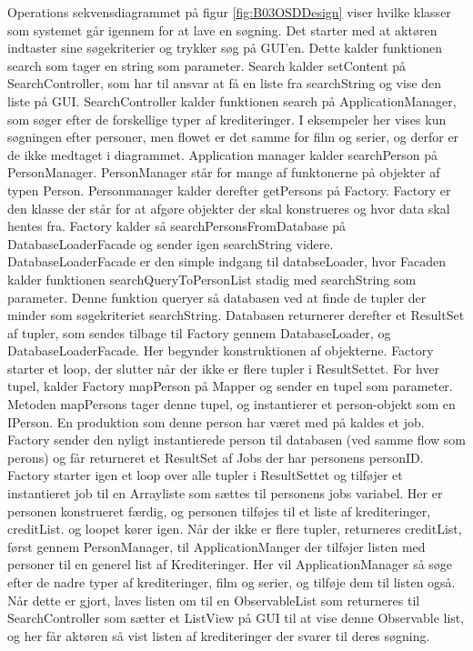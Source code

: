 Operations sekvensdiagrammet på figur \ref{fig:B03OSDDesign} viser hvilke klasser som systemet går igennem for at lave en søgning. Det starter med at aktøren indtaster sine søgekriterier og trykker søg på GUI'en. Dette kalder funktionen search som tager en string som parameter. Search kalder setContent på SearchController, som har til ansvar at få en liste fra searchString og vise den liste på GUI. SearchController kalder funktionen search på ApplicationManager, som søger efter de forskellige typer af krediteringer. I eksempeler her vises kun søgningen efter personer, men flowet er det samme for film og serier, og derfor er de ikke medtaget i diagrammet. Application manager kalder searchPerson på PersonManager. PersonManager står for mange af funktonerne på objekter af typen Person. Personmanager kalder derefter getPersons på Factory. Factory er den klasse der står for at afgøre objekter der skal konstrueres og hvor data skal hentes fra. Factory kalder så searchPersonsFromDatabase på DatabaseLoaderFacade og sender igen searchString videre. DatabaseLoaderFacade er den simple indgang til databseLoader, hvor Facaden kalder funktionen searchQueryToPersonList stadig med searchString som parameter. Denne funktion queryer så databasen ved at finde de tupler der minder som søgekriteriet searchString. Databasen returnerer derefter et ResultSet af tupler, som sendes tilbage til Factory gennem DatabaseLoader, og DatabaseLoaderFacade. Her begynder konstruktionen af objekterne. Factory starter et loop, der slutter når der ikke er flere tupler i ResultSettet. For hver tupel, kalder Factory mapPerson på Mapper og sender en tupel som parameter. Metoden mapPersons tager denne tupel, og instantierer et person-objekt som en IPerson. En produktion som denne person har været med på kaldes et job. Factory sender den nyligt instantierede person til databasen (ved samme flow som perons) og får returneret et ResultSet af Jobs der har personens personID. Factory starter igen et loop over alle tupler i ResultSettet og tilføjer et instantieret job til en Arrayliste som sættes til personens jobs variabel. Her er personen konstrueret færdig, og personen tilføjes til et liste af krediteringer, creditList. og loopet kører igen. Når der ikke er flere tupler, returneres creditList, først gennem PersonManager, til ApplicationManger der tilføjer listen med personer til en generel list af Krediteringer. Her vil ApplicationManager så søge efter de nadre typer af krediteringer, film og serier, og tilføje dem til listen også. Når dette er gjort, laves listen om til en ObservableList som returneres til SearchController som sætter et ListView på GUI til at vise denne Observable list, og her får aktøren så vist listen af krediteringer der svarer til deres søgning.
